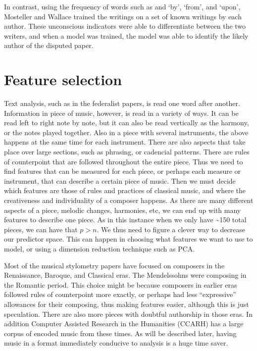 \documentclass[12pt,twoside]{reedthesis}
\theoremstyle{definition}
\theoremstyle{definition}
\theoremstyle{definition}
\theoremstyle{remark}
\begin{document}
In contrast, using the frequency of words such as and `by', `from', and
`upon', Mosteller and Wallace trained the writings on a set of known
writings by each author. These unconscious indicators were able to
differentiate between the two writers, and when a model was trained, the
model was able to identify the likely author of the disputed paper.

\section{Feature selection}\label{feature-selection}

Text analysis, such as in the federalist papers, is read one word after
another. Information in piece of music, however, is read in a variety of
ways. It can be read left to right note by note, but it can also be read
vertically as the harmony, or the notes played together. Also in a piece
with several instruments, the above happens at the same time for each
instrument. There are also aspects that take place over large sections,
such as phrasing, or cadencial patterns. There are rules of counterpoint
that are followed throughout the entire piece. Thus we need to find
features that can be measured for each piece, or perhaps each measure or
instrument, that can describe a certain piece of music. Then we must
decide which features are those of rules and practices of classical
music, and where the creativeness and individuality of a composer
happens. As there are many different aspects of a piece, melodic
changes, harmonies, etc, we can end up with many features to describe
one piece. As in this instance when we only have \textasciitilde{}150
total pieces, we can have that \(p > n\). We thus need to figure a
clever way to decrease our predictor space. This can happen in choosing
what features we want to use to model, or using a dimension reduction
technique such as PCA.

Most of the musical stylometry papers have focused on composers in the
Renaissance, Baroque, and Classical eras. The Mendelssohns were
composing in the Romantic period. This choice might be because composers
in earlier eras followed rules of counterpoint more exactly, or perhaps
had less ``expressive'' allowances for their composing, thus making
features easier, although this is just speculation. There are also more
pieces with doubtful authorship in those eras. In addition Computer
Assisted Research in the Humanities (CCARH) has a large corpus of
encoded music from these times. As will be described later, having music
in a format immediately conducive to analysis is a huge time saver.
\end{document}
